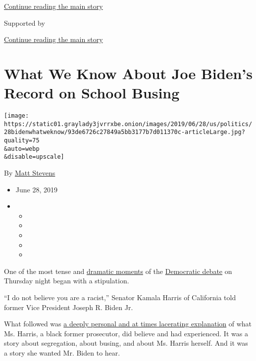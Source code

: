 \protect\hyperlink{after-top}{Continue reading the main story}

Supported by

\protect\hyperlink{after-sponsor}{Continue reading the main story}

\hypertarget{what-we-know-about-joe-bidens-record-on-school-busing}{%
\section{What We Know About Joe Biden's Record on School
Busing}\label{what-we-know-about-joe-bidens-record-on-school-busing}}

\texttt{[image: https://static01.graylady3jvrrxbe.onion/images/2019/06/28/us/politics/28bidenwhatweknow/93de6726c27849a5bb3177b7d011370c-articleLarge.jpg?quality=75\\\&auto=webp\\\&disable=upscale]}

By \href{https://www.nytimes3xbfgragh.onion/by/matt-stevens}{Matt
Stevens}

\begin{itemize}
\item
  June 28, 2019
\item
  \begin{itemize}
  \item
  \item
  \item
  \item
  \item
  \end{itemize}
\end{itemize}

One of the most tense and
\href{https://www.nytimes3xbfgragh.onion/2019/06/27/us/politics/kamala-harris-joe-biden-busing.html}{dramatic
moments} of the
\href{https://www.nytimes3xbfgragh.onion/2019/06/27/us/politics/democratic-debate-live.html}{Democratic
debate} on Thursday night began with a stipulation.

``I do not believe you are a racist,'' Senator Kamala Harris of
California told former Vice President Joseph R. Biden Jr.

What followed was
\href{https://www.nytimes3xbfgragh.onion/2019/06/27/us/politics/kamala-harris-biden-debate.html?rref=collection\%2Fbyline\%2Fmatt-flegenheimer\&action=click\&contentCollection=undefined\&region=stream\&module=stream_unit\&version=latest\&contentPlacement=1\&pgtype=collection}{a
deeply personal and at times lacerating explanation} of what Ms. Harris,
a black former prosecutor, did believe and had experienced. It was a
story about segregation, about busing, and about Ms. Harris herself. And
it was a story she wanted Mr. Biden to hear.

